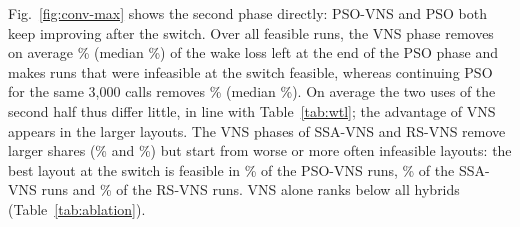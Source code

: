 Fig.~\ref{fig:conv-max} shows the second phase directly: PSO-VNS and PSO both keep improving after the switch. Over all feasible runs, the VNS phase removes on average \NPhTwoMean\% (median \NPhTwoMedian\%) of the wake loss left at the end of the PSO phase and makes \NPhTwoMadeFeas{} runs that were infeasible at the switch feasible, whereas continuing PSO for the same 3,000 calls removes \NPsoContMean\% (median \NPsoContMedian\%). On average the two uses of the second half thus differ little, in line with Table~\ref{tab:wtl}; the advantage of VNS appears in the larger layouts. The VNS phases of SSA-VNS and RS-VNS remove larger shares (\NPhTwoMeanSSAVNS\% and \NPhTwoMeanRSVNS\%) but start from worse or more often infeasible layouts: the best layout at the switch is feasible in \NSwitchFeasPSOVNS\% of the PSO-VNS runs, \NSwitchFeasSSAVNS\% of the SSA-VNS runs and \NSwitchFeasRSVNS\% of the RS-VNS runs. VNS alone ranks below all hybrids (Table~\ref{tab:ablation}).
